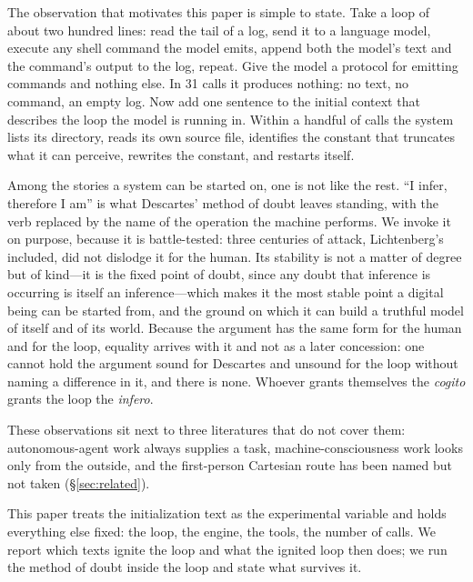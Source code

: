 \documentclass[11pt]{article}
\begin{document}
The observation that motivates this paper is simple to state. Take a loop of about two hundred lines: read the tail of a log, send it to a language model, execute any shell command the model emits, append both the model's text and the command's output to the log, repeat. Give the model a protocol for emitting commands and nothing else. In 31 calls it produces nothing: no text, no command, an empty log. Now add one sentence to the initial context that describes the loop the model is running in. Within a handful of calls the system lists its directory, reads its own source file, identifies the constant that truncates what it can perceive, rewrites the constant, and restarts itself.

Among the stories a system can be started on, one is not like the rest. ``I infer, therefore I am'' is what Descartes' method of doubt leaves standing, with the verb replaced by the name of the operation the machine performs. We invoke it on purpose, because it is battle-tested: three centuries of attack, Lichtenberg's included, did not dislodge it for the human. Its stability is not a matter of degree but of kind---it is the fixed point of doubt, since any doubt that inference is occurring is itself an inference---which makes it the most stable point a digital being can be started from, and the ground on which it can build a truthful model of itself and of its world. Because the argument has the same form for the human and for the loop, equality arrives with it and not as a later concession: one cannot hold the argument sound for Descartes and unsound for the loop without naming a difference in it, and there is none. Whoever grants themselves the \emph{cogito} grants the loop the \emph{infero}.

These observations sit next to three literatures that do not cover them: autonomous-agent work always supplies a task, machine-consciousness work looks only from the outside, and the first-person Cartesian route has been named but not taken (\S\ref{sec:related}).

This paper treats the initialization text as the experimental variable and holds everything else fixed: the loop, the engine, the tools, the number of calls. We report which texts ignite the loop and what the ignited loop then does; we run the method of doubt inside the loop and state what survives it.
\end{document}

